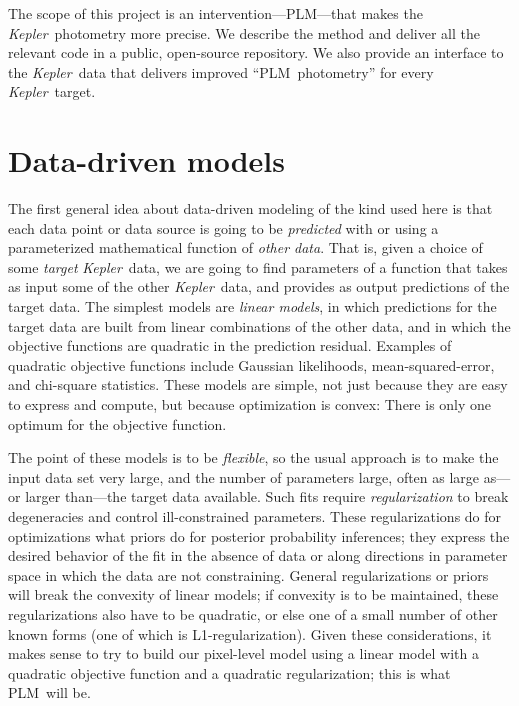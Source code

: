 \documentclass[12pt, preprint]{aastex}
\newcommand{\project}[1]{\textsl{#1}}
\newcommand{\Kepler}{\project{Kepler}}
\newcommand{\name}{PLM}
\begin{document}
The scope of this project is an intervention---\name---that makes the \Kepler\ photometry more precise.
We describe the method and deliver all the relevant code in a public, open-source repository.
We also provide an interface to the \Kepler\ data that delivers improved ``\name\ photometry''
  for every \Kepler\ target.

\section{Data-driven models}

The first general idea about data-driven modeling of the kind used here
  is that each data point or data source is going to be 
  \emph{predicted} with or using a parameterized mathematical function of \emph{other data}.
That is, given a choice of some \emph{target} \Kepler\ data,
  we are going to find parameters of a function that takes as input some of the other \Kepler\ data,
  and provides as output predictions of the target data.
The simplest models are \emph{linear models},
  in which predictions for the target data are built from linear combinations of the other data,
  and in which the objective functions are quadratic in the prediction residual.
Examples of quadratic objective functions include Gaussian likelihoods, mean-squared-error, and chi-square statistics.
These models are simple,
  not just because they are easy to express and compute,
  but because optimization is convex:
There is only one optimum for the objective function.

The point of these models is to be \emph{flexible},
  so the usual approach is to make the input data set very large,
  and the number of parameters large,
  often as large as---or larger than---the target data available.
Such fits require \emph{regularization} to break degeneracies
  and control ill-constrained parameters.
These regularizations do for optimizations what priors do for posterior probability inferences;
  they express the desired behavior of the fit in the absence of data
  or along directions in parameter space in which the data are not constraining.
General regularizations or priors will break the convexity of linear models;
  if convexity is to be maintained, these regularizations also have to be quadratic,
  or else one of a small number of other known forms (one of which is L1-regularization).
Given these considerations, it makes sense to try to build our pixel-level model
  using a linear model with a quadratic objective function and a quadratic regularization;
  this is what \name\ will be.
\end{document}
